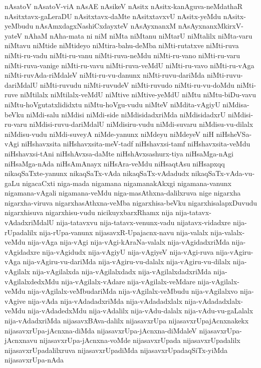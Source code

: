 {nAsatoV
nAsatoV-viA
nAsAE
nAsikeV
nAsitx
nAsitx-kanAguva-neMdathaR
nAsitxtavx-gaLeraDU
nAsitxtavx-daMte
nAsitxtavxvU
nAsitx-yeMdu
nAsitx-yeMbudu
nAsAmxdagxNashiCxdayxteV
nAsAyxnanxM
nAsAyxnanxMkirxV-yateV
nAhaM
nAha-mata
ni
niM
niMta
niMtanu
niMtarU
niMtalilx
niMta-varu
niMtavu
niMtide
niMtideyo
niMtira-bahu-deMba
niMti-rutatxve
niMti-ruva
niMti-ru-vadu
niMti-ru-vanu
niMti-ruva-neMdu
niMti-ru-vano
niMti-ru-varu
niMti-ruva-vanige
niMti-ru-vavu
niMti-ruva-veMdU
niMti-ru-vavo
niMti-ru-vAga
niMti-ruvAda-riMdaleV
niMti-ru-vu-danunx
niMti-ruvu-dariMda
niMti-ruvu-dariMdalU
niMti-ruvudu
niMti-ruvudeV
niMti-ruvudo
niMti-ru-vu-doMdu
niMti-ruve
niMtilalx
niMtilalx-veMdU
niMtive
niMtive-yeMdU
niMtu
niMtu-biDu-vavu
niMtu-hoVgutatxlididxtu
niMtu-hoVgu-vudu
niMteV
niMdita-vAgiyU
niMdisa-beVku
niMdi-salu
niMdisi
niMdi-side
niMdisidadxriMda
niMdisidadxrU
niMdisi-ru-varu
niMdisi-ruvu-dariMdalU
niMdisiru-vudu
niMdi-suvaru
niMdisu-vu-dilalx
niMdisu-vudu
niMdi-suveyA
niMde-yanunx
niMdeyu
niMdeyeV
niH
niHsheVSa-vAgi
niHshavxsita
niHshavxsita-meV-tadf
niHshavxsi-tamf
niHshavxsita-veMdu
niHshavxsi-tAni
niHshAvxsa-daMte
niHshAvxsashurx-tiya
niHsaMga-nAgi
niHsaMga-nAda
niHsAmAnayx
niHsAra-veMdu
niHsaqtAsu
niHsapxqq
nikaqSaTxte-yanunx
nikaqSaTx-vAda
nikaqSaTx-vAdadudx
nikaqSaTx-vAda-vu-gaLu
nigacaCxti
niga-mada
nigamana
nigamanakAkxgi
nigamana-vanunx
nigamana-vAgali
nigamana-veMdu
niga-masAthxna-dalilxruva
nige
nigarxha
nigarxha-viruva
nigarxhasAthxna-veMba
nigarxhisa-beVku
nigarxhisalapxDuvudu
nigarxhisuva
nigarxhisu-vudu
nicikuyxbarxRhamx
nija
nija-tatavx-vAdadxriMdalU
nija-tatavxvu
nija-tatavx-venunx-vadu
nijatavx-vidadxre
nija-rUpadalilx
nija-rUpa-vanunx
nijasavxR-Upajacnx-navu
nija-valalx
nija-valalx-veMdu
nija-vAga
nija-vAgi
nija-vAgi-kAraNa-valalx
nija-vAgidadxriMda
nija-vAgidadxre
nija-vAgidudx
nija-vAgiyU
nija-vAgiyeV
nija-vAgi-ruva
nija-vAgiru-vAga
nija-vAgiru-vu-dariMda
nija-vAgiru-vu-dalalx
nija-vAgiru-vu-dilalx
nija-vAgilalx
nija-vAgilalxda
nija-vAgilalxdadx
nija-vAgilalxdadxriMda
nija-vAgilalxdedxMdu
nija-vAgilalx-vAdare
nija-vAgilalx-veMdare
nija-vAgilalx-veMdu
nija-vAgilalx-veMbudariMda
nija-vAgilalx-veMbudu
nija-vAgilalxvo
nija-vAgive
nija-vAda
nija-vAdadadxriMda
nija-vAdadadxlalx
nija-vAdadadxlalx-veMdu
nija-vAdadedxMdu
nija-vAdalilx
nija-vAdu-dalalx
nija-vAdu-vu-gaLalalx
nija-vAdadxriMda
nijasavxBAva-dalilx
nijasavxrUpa
nijasavxrUpajAcnxnakekx
nijasavxrUpa-jAcnxna-diMda
nijasavxrUpa-jAcnxna-diMdaleV
nijasavxrUpa-jAcnxnavu
nijasavxrUpa-jAcnxna-voMde
nijasavxrUpada
nijasavxrUpadalilx
nijasavxrUpadalilxruva
nijasavxrUpadiMda
nijasavxrUpadaqSiTx-yiMda
nijasavxrUpa-nAda
}
